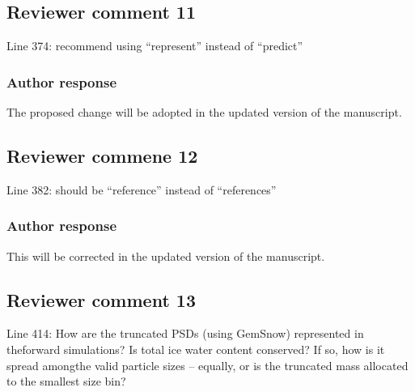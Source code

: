 \documentclass[11pt]{scrartcl}
\providecommand{\DIFadd}[1]{{\protect\textcolor{blue}{\uwave{#1}}}} %
\providecommand{\DIFdel}[1]{{\protect\textcolor{red}{\sout{#1}}}}                      %
\providecommand{\DIFaddbegin}{} %
\providecommand{\DIFaddend}{} %
\providecommand{\DIFdelbegin}{} %
\providecommand{\DIFdelend}{} %
\newenvironment{change}[1][]{%
  \begin{mdframed}[frametitle={Line #1:}]%
}{%
  \end{mdframed}%
}
\begin{document}
\begin{itemize}
\subsection*{Reviewer comment 11}
 Line 374: recommend using “represent” instead of “predict”

\subsubsection*{Author response}

The proposed change will be adopted in the updated version of the manuscript.


\subsection*{Reviewer commene 12}

 Line 382: should be “reference” instead of “references”

\subsubsection*{Author response}
This will be corrected in the updated version of the manuscript.


\subsection*{Reviewer comment 13}

Line  414:  How  are  the  truncated  PSDs  (using  GemSnow)  represented  in  theforward simulations? Is total ice water content conserved? If so, how is it spread amongthe valid particle sizes – equally, or is the truncated mass allocated to the smallest size bin?


\end{itemize}
\end{document}
